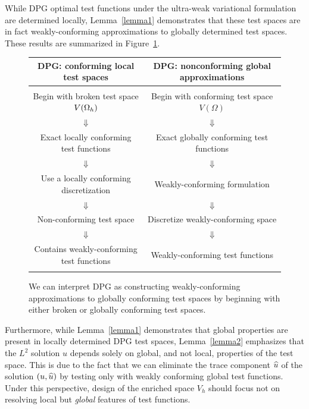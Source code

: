While DPG optimal test functions under the ultra-weak variational formulation are determined locally, Lemma~\ref{lemma1} demonstrates that these test spaces are in fact weakly-conforming approximations to globally determined test spaces.  These results are summarized in Figure~\ref{fig:diagram}.  
\begin{figure}[!h]
\centering
\begin{tabular}{|| c | c ||}
\hline
\textbf{DPG: conforming local test spaces}  & 
\textbf{DPG: nonconforming global approximations}\\
\hline & \\
Begin with broken test space $V(\Oh)$ & Begin with conforming test space $V(\Omega)$\\
$\Downarrow$ & $\Downarrow$\\ 
Exact locally conforming test functions & Exact globally conforming test functions\\
$\Downarrow$ & $\Downarrow$\\ 
Use a locally conforming discretization & Weakly-conforming formulation \\
$\Downarrow$ & $\Downarrow$  \\ 
Non-conforming test space &  Discretize weakly-conforming space\\
$\Downarrow$ & $\Downarrow$  \\ 
Contains weakly-conforming test functions & Weakly-conforming test functions \\
& \\ \hline
\end{tabular}
\caption{We can interpret DPG as constructing weakly-conforming approximations to globally conforming test spaces by beginning with either broken or globally conforming test spaces. }
\label{fig:diagram}
\end{figure}

Furthermore, while Lemma~\ref{lemma1} demonstrates that global properties are present in locally determined DPG test spaces, Lemma~\ref{lemma2} emphasizes that the $L^2$ solution $u$ depends solely on global, and not local, properties of the test space.  This is due to the fact that we can eliminate the trace component $\uh$ of the solution $\LRp{u,\uh}$ by testing only with weakly conforming global test functions.  Under this perspective, design of the enriched space $V_h$ should focus not on resolving local but \textit{global} features of test functions.  

